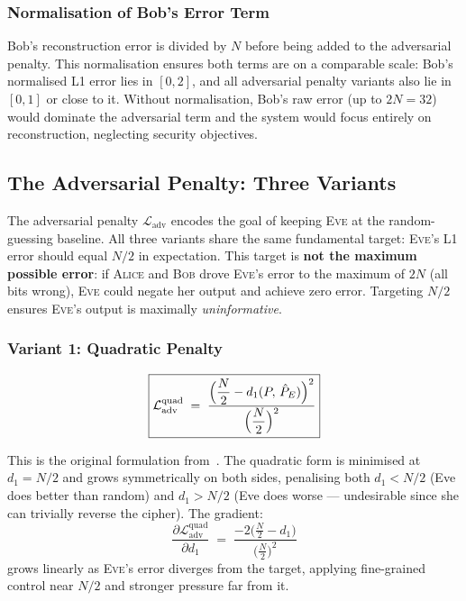 \documentclass[12pt, a4paper]{article}
\newcommand{\alice}{\textsc{Alice}}
\newcommand{\bob}{\textsc{Bob}}
\newcommand{\eve}{\textsc{Eve}}
\begin{document}
\subsubsection*{Normalisation of Bob's Error Term}

Bob's reconstruction error is divided by $N$ before being added to the
adversarial penalty. This normalisation ensures both terms are on a
comparable scale: Bob's normalised L1 error lies in $[0, 2]$, and all
adversarial penalty variants also lie in $[0, 1]$ or close to it.
Without normalisation, Bob's raw error (up to $2N = 32$) would dominate
the adversarial term and the system would focus entirely on reconstruction,
neglecting security objectives.

\subsection{The Adversarial Penalty: Three Variants}
\label{subsec:adv_penalty}

The adversarial penalty $\mathcal{L}_{\mathrm{adv}}$ encodes the goal
of keeping \eve{} at the random-guessing baseline. All three variants
share the same fundamental target: \eve{}'s L1 error should equal $N/2$
in expectation. This target is \textbf{not the maximum possible error}:
if \alice{} and \bob{} drove \eve{}'s error to the maximum of $2N$
(all bits wrong), \eve{} could negate her output and achieve zero error.
Targeting $N/2$ ensures \eve{}'s output is maximally \emph{uninformative}.

\subsubsection*{Variant 1: Quadratic Penalty}

\begin{equation}
  \boxed{
  \mathcal{L}_{\mathrm{adv}}^{\mathrm{quad}}
  \;=\;
  \frac{\Bigl(\dfrac{N}{2} - d_1(P,\, \hat{P}_E)\Bigr)^2}
       {\Bigl(\dfrac{N}{2}\Bigr)^2}
  }
  \label{eq:adv_quad}
\end{equation}

This is the original formulation from~\cite{abadi2016learning}. The
quadratic form is minimised at $d_1 = N/2$ and grows symmetrically
on both sides, penalising both $d_1 < N/2$ (Eve does better than
random) and $d_1 > N/2$ (Eve does worse --- undesirable since she
can trivially reverse the cipher). The gradient:
%
\begin{equation}
  \frac{\partial \mathcal{L}_{\mathrm{adv}}^{\mathrm{quad}}}{\partial d_1}
  \;=\; \frac{-2\bigl(\tfrac{N}{2} - d_1\bigr)}{\bigl(\tfrac{N}{2}\bigr)^2}
  \label{eq:quad_grad}
\end{equation}
%
grows linearly as \eve{}'s error diverges from the target, applying
fine-grained control near $N/2$ and stronger pressure far from it.
\end{document}
